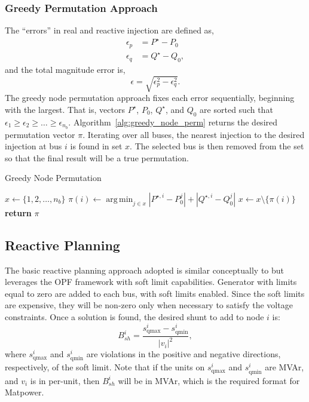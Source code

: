 \documentclass[12pt]{article}
\newcommand{\matpower}[0]{{\sc Matpower}}
\DeclareMathOperator*{\argmin}{arg\,min} %
\numberwithin{equation}{section}
\numberwithin{table}{section}
\numberwithin{figure}{section}
\begin{document}
\subsubsection{Greedy Permutation Approach}
The ``errors'' in real and reactive injection are defined as,
\begin{equation}
\begin{aligned}
	\epsilon_p &= P^{\star} - P_0 \\
	\epsilon_q &= Q^{\star} - Q_0,
\end{aligned}
\end{equation}
and the total magnitude error is,
\begin{equation}
	\epsilon = \sqrt{ \epsilon_p^2 - \epsilon_q^2}.
\end{equation}
The greedy node permutation approach fixes each error sequentially, beginning with the largest.
That is, vectors $P^{\star}$, $P_0$, $Q^{\star}$, and $Q_0$ are sorted such that $\epsilon_1 \geq \epsilon_2 \geq \ldots \geq \epsilon_{n_b}$.
Algorithm~\ref{alg:greedy_node_perm} returns the desired permutation vector $\pi$.
Iterating over all buses, the nearest injection to the desired injection at bus $i$ is found in set $x$.
The selected bus is then removed from the set so that the final result will be a true permutation.

\begin{algorithm}
\caption[Greedy Node Permutation]{Greedy Node Permutation}
\label{alg:greedy_node_perm}
\begin{algorithmic}
\State $ x \gets \{ 1,2,\ldots, n_b\}$
	\State $\pi(i) \gets \argmin_{j\in x} |P^{\star,i} - P_0^j| +  |Q^{\star,i} - Q_0^j| $
	\State $ x \gets x\setminus\{\pi(i)\} $
\EndFor
\State \textbf{return} {$\pi$}
\EndProcedure
\end{algorithmic}
\end{algorithm}

\subsection{Reactive Planning} \label{sec:vm_shunts}
The basic reactive planning approach adopted is similar conceptually to {\cite{birchfield2018Power}} but leverages the OPF framework with soft limit capabilities. %
Generator with limits equal to zero are added to each bus, with soft limits enabled. 
Since the soft limits are expensive, they will be non-zero only when necessary to satisfy the voltage constraints.
Once a solution is found, the desired shunt to add to node $i$ is:
\begin{equation}
	B_{sh}^i = \frac{s_{\text{qmax}}^i - s_{\text{qmin}}^i}{|v_i|^2},
\end{equation}
where $s_{\text{qmax}}^i$ and $s_{\text{qmin}}^i$ are violations in the positive and negative directions, respectively, of the soft limit.
Note that if the units on $s_{\text{qmax}}^i$ and $s_{\text{qmin}}^i$ are MVAr, and $v_i$ is in per-unit, then $B_{sh}^i$ will be in MVAr, which is the required format for \matpower{}.
\end{document}

